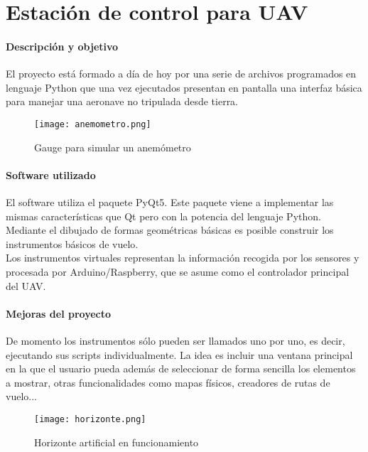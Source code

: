 \section{Estación de control para UAV}

\paragraph{Descripción y objetivo}
El proyecto está formado a día de hoy por una serie de archivos programados en lenguaje Python que una vez ejecutados presentan en pantalla una interfaz básica para manejar una aeronave no tripulada desde tierra.

\begin{wrapfigure}{r}{0.5\linewidth}
	\centering
	\texttt{[image: anemometro.png]}
	\caption*{Gauge para simular un anemómetro}
	\label{labelformat=empty}
\end{wrapfigure}

\paragraph{Software utilizado}
El software utiliza el paquete PyQt5. Este paquete viene a implementar las mismas características que Qt pero con la potencia del lenguaje Python. Mediante el dibujado de formas geométricas básicas es posible construir los instrumentos básicos de vuelo.\\

Los instrumentos virtuales representan la información recogida por los sensores y procesada por Arduino/Raspberry, que se asume como el controlador principal del UAV.

\paragraph{Mejoras del proyecto}

De momento los instrumentos sólo pueden ser llamados uno por uno, es decir, ejecutando sus scripts individualmente. La idea es incluir una ventana principal en la que el usuario pueda además de seleccionar de forma sencilla los elementos a mostrar, otras funcionalidades como mapas físicos, creadores de rutas de vuelo...

\begin{wrapfigure}{r}{0.5\linewidth}
	\centering
	\texttt{[image: horizonte.png]}
	\caption*{Horizonte artificial en funcionamiento}
	\label{labelformat=empty}
\end{wrapfigure}

